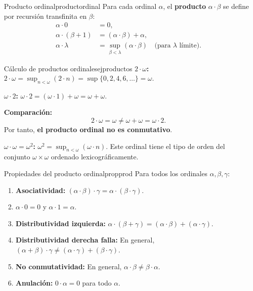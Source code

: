 \begin{definicion}{Producto ordinal}{productordinal}
Para cada ordinal $\alpha$, el \textbf{producto} $\alpha \cdot \beta$ se define por recursión transfinita en $\beta$:
\begin{align*}
  \alpha \cdot 0 &= 0,\\
  \alpha \cdot (\beta + 1) &= (\alpha \cdot \beta) + \alpha,\\
  \alpha \cdot \lambda &= \sup_{\beta < \lambda}(\alpha \cdot \beta) \quad\text{(para } \lambda \text{ límite)}.
\end{align*}
\end{definicion}

\begin{ejemplo}{Cálculo de productos ordinales}{ejproductos}
\textbf{$2 \cdot \omega$:} $2 \cdot \omega = \sup_{n < \omega}(2 \cdot n) = \sup\{0, 2, 4, 6, \ldots\} = \omega$.

\textbf{$\omega \cdot 2$:} $\omega \cdot 2 = (\omega \cdot 1) + \omega = \omega + \omega$.

\textbf{Comparación:}
\[
  2 \cdot \omega = \omega \neq \omega + \omega = \omega \cdot 2.
\]
Por tanto, \textbf{el producto ordinal no es conmutativo}.

\textbf{$\omega \cdot \omega = \omega^2$:} $\omega^2 = \sup_{n < \omega}(\omega \cdot n)$. Este ordinal tiene el tipo de orden del conjunto $\omega \times \omega$ ordenado lexicográficamente.
\end{ejemplo}

\begin{proposicion}{Propiedades del producto ordinal}{propprod}
Para todos los ordinales $\alpha, \beta, \gamma$:
\begin{enumerate}[leftmargin=2em, label=(\roman*)]
  \item \textbf{Asociatividad:} $(\alpha \cdot \beta) \cdot \gamma = \alpha \cdot (\beta \cdot \gamma)$.
  \item $\alpha \cdot 0 = 0$ y $\alpha \cdot 1 = \alpha$.
  \item \textbf{Distributividad izquierda:} $\alpha \cdot (\beta + \gamma) = (\alpha \cdot \beta) + (\alpha \cdot \gamma)$.
  \item \textbf{Distributividad derecha falla:} En general, $(\alpha + \beta) \cdot \gamma \neq (\alpha \cdot \gamma) + (\beta \cdot \gamma)$.
  \item \textbf{No conmutatividad:} En general, $\alpha \cdot \beta \neq \beta \cdot \alpha$.
  \item \textbf{Anulación:} $0 \cdot \alpha = 0$ para todo $\alpha$.
\end{enumerate}
\end{proposicion}

